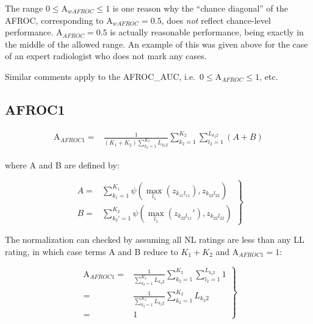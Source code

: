 \documentclass[
]{book}
\begin{document}
The range \(0 \leq \text{A}_{wAFROC} \leq 1\) is one reason why the ``chance diagonal'' of the AFROC, corresponding to \(\text{A}_{wAFROC} = 0.5\), does \emph{not} reflect chance-level performance. \(\text{A}_{AFROC} = 0.5\) is actually reasonable performance, being exactly in the middle of the allowed range. An example of this was given above for the case of an expert radiologist who does not mark any cases.

Similar comments apply to the AFROC\_AUC, i.e.~\(0 \leq \text{A}_{AFROC} \leq 1\), etc.

\hypertarget{afroc1}{%
\subsection{AFROC1}\label{afroc1}}

\begin{equation}
\begin{aligned}
\text{A}_{AFROC1} =& \frac{1}{\left (K_1 +K_2 \right )\sum_{k_2=1}^{K_2}L_{k_2 2}}\sum_{k_2=1}^{K_2}\sum_{l_2=1}^{L_{k_2 2}} \left( A + B \right)
\end{aligned}
\label{eq:empirical-computational-afroc1}
\end{equation}

where A and B are defined by:

\begin{equation}
\left. 
\begin{aligned}
A =& \sum_{k_1=1}^{K_1}\psi\left ( \max_{l_1}\left (z_{k_11l_11}  \right ),z_{k_22l_22} \right ) \\
B =& \sum_{k_2'=1}^{K_2}\psi\left ( \max_{l_1}\left (z_{k_22l_11}'  \right ),z_{k_22l_22} \right )
\end{aligned}
\right \} 
\label{eq:empirical-computational-afroc1ab}
\end{equation}

The normalization can checked by assuming all NL ratings are less than any LL rating, in which case terms A and B reduce to \(K_1+K_2\) and \(\text{A}_{AFROC1} = 1\):

\begin{equation}
\left. 
\begin{aligned}
\text{A}_{AFROC1} =& \frac{1}{\sum_{k_2=1}^{K_2}L_{k_2 2}}\sum_{k_2=1}^{K_2}\sum_{l_2=1}^{L_{k_2 2}} 1 \\
=& \frac{1}{\sum_{k_2=1}^{K_2}L_{k_2 2}}\sum_{k_2=1}^{K_2}L_{k_2 2} \\
=& 1
\end{aligned}
\right \} 
\label{eq:empirical-computational-afroc1a}
\end{equation}
\end{document}
